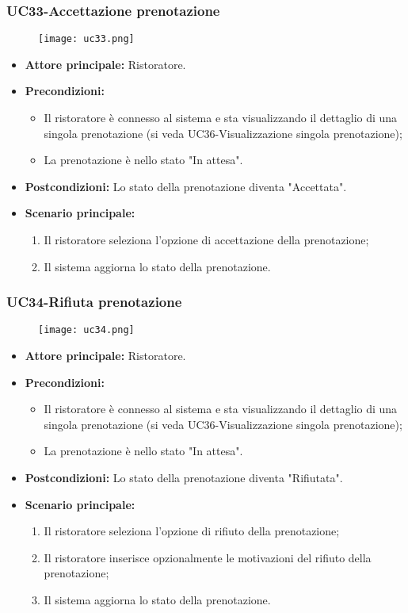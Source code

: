 \subsubsection{UC33-Accettazione prenotazione}
\begin{figure}[h] \texttt{[image: uc33.png]} \end{figure}
\begin{itemize}
\item \textbf{Attore principale:} Ristoratore.
\item \textbf{Precondizioni:}
\begin{itemize}
        \item Il ristoratore è connesso al sistema e sta visualizzando il dettaglio di una singola prenotazione (si veda UC36-Visualizzazione singola prenotazione);
        \item La prenotazione è nello stato "In attesa".
\end{itemize}
\item \textbf{Postcondizioni:} Lo stato della prenotazione diventa "Accettata".
\item \textbf{Scenario principale:}
\begin{enumerate}
    \item Il ristoratore seleziona l'opzione di accettazione della prenotazione;
    \item Il sistema aggiorna lo stato della prenotazione.
\end{enumerate}
\end{itemize}

\pagebreak
\subsubsection{UC34-Rifiuta prenotazione}
\begin{figure}[h] \texttt{[image: uc34.png]} \end{figure}
\begin{itemize}
\item \textbf{Attore principale:} Ristoratore.
\item \textbf{Precondizioni:}
\begin{itemize}
        \item Il ristoratore è connesso al sistema e sta visualizzando il dettaglio di una singola prenotazione (si veda UC36-Visualizzazione singola prenotazione);
        \item La prenotazione è nello stato "In attesa".
\end{itemize}
\item \textbf{Postcondizioni:} Lo stato della prenotazione diventa "Rifiutata".
\item \textbf{Scenario principale:}
\begin{enumerate}
    \item Il ristoratore seleziona l'opzione di rifiuto della prenotazione;
    \item Il ristoratore inserisce opzionalmente le motivazioni del rifiuto della prenotazione;
    \item Il sistema aggiorna lo stato della prenotazione.
\end{enumerate}
\end{itemize}

